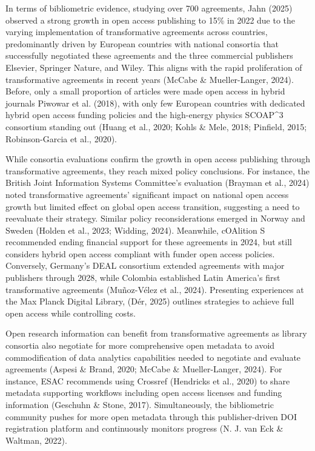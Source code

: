 \documentclass[a4paper,man,floatsintext,longtable,noextraspace,10pt]{apa6}
\begin{document}
In terms of bibliometric evidence, studying over 700 agreements, Jahn
(2025) observed a strong growth in open access publishing to 15\% in
2022 due to the varying implementation of transformative agreements
across countries, predominantly driven by European countries with
national consortia that successfully negotiated these agreements and the
three commercial publishers Elsevier, Springer Nature, and Wiley. This
aligns with the rapid proliferation of transformative agreements in
recent years (McCabe \& Mueller-Langer, 2024). Before, only a small
proportion of articles were made open access in hybrid journals Piwowar
et al. (2018), with only few European countries with dedicated hybrid
open access funding policies and the high-energy physics SCOAP\^{}3
consortium standing out (Huang et al., 2020; Kohls \& Mele, 2018;
Pinfield, 2015; Robinson-Garcia et al., 2020).

While consortia evaluations confirm the growth in open access publishing
through transformative agreements, they reach mixed policy conclusions.
For instance, the British Joint Information Systems Committee's
evaluation (Brayman et al., 2024) noted transformative agreements'
significant impact on national open access growth but limited effect on
global open access transition, suggesting a need to reevaluate their
strategy. Similar policy reconsiderations emerged in Norway and Sweden
(Holden et al., 2023; Widding, 2024). Meanwhile, cOAlition S recommended
ending financial support for these agreements in 2024, but still
considers hybrid open access compliant with funder open access policies.
Conversely, Germany's DEAL consortium extended agreements with major
publishers through 2028, while Colombia established Latin America's
first transformative agreements (Muñoz-Vélez et al., 2024). Presenting
experiences at the Max Planck Digital Library, (Dér, 2025) outlines
strategies to achieve full open access while controlling costs.

Open research information can benefit from transformative agreements as
library consortia also negotiate for more comprehensive open metadata to
avoid commodification of data analytics capabilities needed to negotiate
and evaluate agreements (Aspesi \& Brand, 2020; McCabe \&
Mueller-Langer, 2024). For instance, ESAC recommends using Crossref
(Hendricks et al., 2020) to share metadata supporting workflows
including open access licenses and funding information (Geschuhn \&
Stone, 2017). Simultaneously, the bibliometric community pushes for more
open metadata through this publisher-driven DOI registration platform
and continuously monitors progress (N. J. van Eck \& Waltman, 2022).
\end{document}
